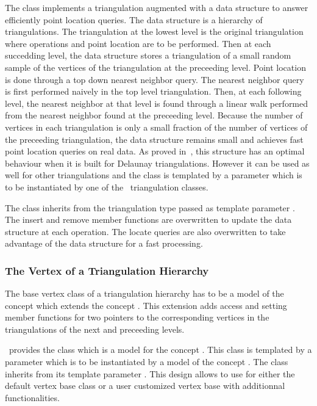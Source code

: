 The class 
implements a triangulation augmented with
a data structure to answer efficiently  point location queries.
The data structure is a hierarchy 
of triangulations. The triangulation at the lowest level is
the original triangulation where operations and point location are to 
be performed.
Then at each succedding level, the data structure
stores a triangulation of a small random sample of the vertices
of the triangulation at the preceeding level. Point location
is done through a top down nearest neighbor query.
The nearest neighbor query is first
performed naively in the top level triangulation.
Then, at each following level, the nearest neighbor at that level
is found through a linear walk performed from
the nearest neighbor found at the preceeding level.
Because the number of vertices in each triangulation is only a small
fraction of the number of vertices of the preceeding triangulation,
the data structure remains small and achieves fast point location 
queries  on real
data. As proved in~\cite{d-iirdt-98}, this structure has an optimal behaviour
when it is built for Delaunay triangulations.
However it can be used as well for other triangulations
and the class  is templated by a parameter
which is to be instantiated by one of the \cgal\ triangulation
classes. 

The class  inherits from the
triangulation type passed as template parameter . 
The insert and remove member functions
are  overwritten to update the data structure at each operation.
The locate queries are also overwritten to take advantage of the data
structure for a fast processing.

\subsubsection{The Vertex of a Triangulation Hierarchy}
The base vertex class  of a triangulation hierarchy 
has to be a model of the
concept
 which extends
the concept .
This extension adds
access and setting member functions 
for two pointers  to the corresponding vertices in the 
triangulations of the next and preceeding levels.

\cgal\ provides the class 
which is a model for the concept 
.
This class is templated by a parameter 
which is to be instantiated by a model of  the concept
.
The class  inherits
from its template parameter .
This design allows to use for   
either the default
vertex base class or a user customized
vertex base with additionnal functionalities.

